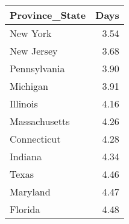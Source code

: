 \begin{tabular}{lr}
\toprule
Province\_State &  Days \\
\midrule
      New York &  3.54 \\
    New Jersey &  3.68 \\
  Pennsylvania &  3.90 \\
      Michigan &  3.91 \\
      Illinois &  4.16 \\
 Massachusetts &  4.26 \\
   Connecticut &  4.28 \\
       Indiana &  4.34 \\
         Texas &  4.46 \\
      Maryland &  4.47 \\
       Florida &  4.48 \\
\bottomrule
\end{tabular}
